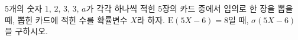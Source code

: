 5개의 숫자 $1$, $2$, $3$, $3$, $a$가 각각 하나씩 적힌 5장의 카드 중에서 임의로 한 장을 뽑을 때, 뽑힌 카드에 적힌 수를 확률변수 $X$라 하자. $\mathrm{E}(5X-6)=8$일 때, $\sigma(5X-6)$을 구하시오.
